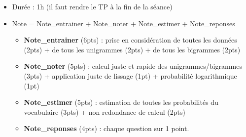 \documentclass[11pt, a4paper]{article}
\begin{document}
\begin{itemize}
	\item Durée : 1h (il faut rendre le TP à la fin de la séance)
	\item Note = Note\_entrainer + Note\_noter + Note\_estimer + Note\_reponses
	\begin{itemize}
		\item \textbf{Note\_entrainer}  (6pts) : prise en considération de toutes les données (2pts) + de tous les unigrammes (2pts) + de tous les bigrammes (2pts)
		\item \textbf{Note\_noter} (5pts) : calcul juste et rapide des unigrammes/bigrammes (3pts) + application juste de lissage (1pt) + probabilité logarithmique (1pt)
		\item \textbf{Note\_estimer} (5pts) : estimation de toutes les probabilités du vocabulaire (3pts) + non redondance de calcul (2pts)
		\item \textbf{Note\_reponses} (4pts) : chaque question sur 1 point.
	\end{itemize}
\end{itemize}
\end{document}
